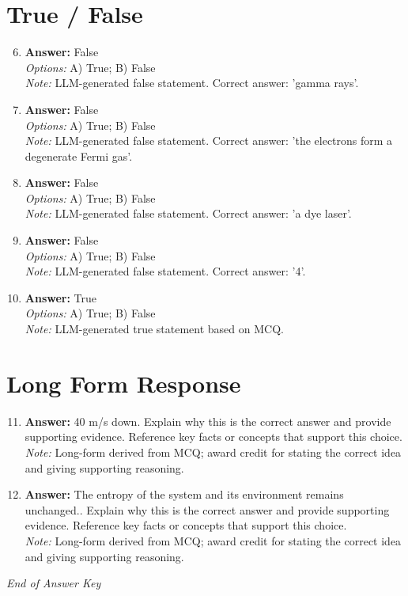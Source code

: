 \documentclass[12pt]{article}
\begin{document}
\section*{True / False}
\begin{enumerate}[label=\arabic*.]
\setcounter{enumi}{5}
\item \textbf{Answer:} False
\\ \textit{Options:} A) True; B) False
\\ \textit{Note:} LLM-generated false statement. Correct answer: 'gamma rays'.
\item \textbf{Answer:} False
\\ \textit{Options:} A) True; B) False
\\ \textit{Note:} LLM-generated false statement. Correct answer: 'the electrons form a degenerate Fermi gas'.
\item \textbf{Answer:} False
\\ \textit{Options:} A) True; B) False
\\ \textit{Note:} LLM-generated false statement. Correct answer: 'a dye laser'.
\item \textbf{Answer:} False
\\ \textit{Options:} A) True; B) False
\\ \textit{Note:} LLM-generated false statement. Correct answer: '4'.
\item \textbf{Answer:} True
\\ \textit{Options:} A) True; B) False
\\ \textit{Note:} LLM-generated true statement based on MCQ.
\end{enumerate}

\section*{Long Form Response}
\begin{enumerate}[label=\arabic*.]
\setcounter{enumi}{10}
\item \textbf{Answer:} 40 m/s down. Explain why this is the correct answer and provide supporting evidence. Reference key facts or concepts that support this choice.
\\ \textit{Note:} Long-form derived from MCQ; award credit for stating the correct idea and giving supporting reasoning.
\item \textbf{Answer:} The entropy of the system and its environment remains unchanged.. Explain why this is the correct answer and provide supporting evidence. Reference key facts or concepts that support this choice.
\\ \textit{Note:} Long-form derived from MCQ; award credit for stating the correct idea and giving supporting reasoning.
\end{enumerate}

\vfill
\noindent\textit{End of Answer Key}
\end{document}
